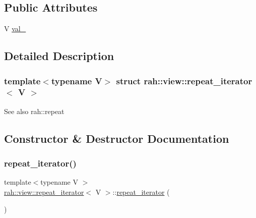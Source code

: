 \subsection*{Public Attributes}
\begin{DoxyCompactItemize}
\item 
V \mbox{\hyperlink{structrah_1_1view_1_1repeat__iterator_a6286ca38cb848630cb870dc6ab42eb79}{val\+\_\+}}
\end{DoxyCompactItemize}


\subsection{Detailed Description}
\subsubsection*{template$<$typename V$>$\newline
struct rah\+::view\+::repeat\+\_\+iterator$<$ V $>$}

\begin{DoxySeeAlso}{See also}
rah\+::repeat 
\end{DoxySeeAlso}


\subsection{Constructor \& Destructor Documentation}
\mbox{\label{structrah_1_1view_1_1repeat__iterator_a627f63a3a1ecf8a5dbcc88fb47d4a494}} 
\subsubsection{\texorpdfstring{repeat\_iterator()}{repeat\_iterator()}\hspace{0.1cm}{\footnotesize\ttfamily [1/2]}}
{\footnotesize\ttfamily template$<$typename V $>$ \\
\mbox{\hyperlink{structrah_1_1view_1_1repeat__iterator}{rah\+::view\+::repeat\+\_\+iterator}}$<$ V $>$\+::\mbox{\hyperlink{structrah_1_1view_1_1repeat__iterator}{repeat\+\_\+iterator}} (\begin{DoxyParamCaption}{ }\end{DoxyParamCaption})\hspace{0.3cm}{\ttfamily [default]}}


